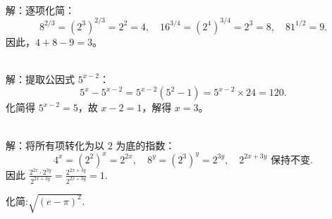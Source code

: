 \documentclass{ctexart}
\newenvironment{MyAnswer}[1][] %
{
    \begin{tcolorbox}[breakable, colframe=blue]
    \begin{Answer}[#1] \color{blue} \kaishu
        }  %
    {\end{Answer}
\end{tcolorbox}
}
\begin{document}
\begin{MyAnswer}[ref={ex:exponent2}]
    \Question {}\\ 
    解：逐项化简：
    $$
    8^{2/3} = (2^3)^{2/3} = 2^2 = 4, \quad 
    16^{3/4} = (2^4)^{3/4} = 2^3 = 8, \quad 
    81^{1/2} = 9.
    $$
    因此，$4 + 8 - 9 = 3$。  
 
    \Question {}\\ 
    解：提取公因式 $5^{x-2}$：
    $$
    5^{x} - 5^{x-2} = 5^{x-2}(5^2 - 1) = 5^{x-2} \times 24 = 120.
    $$
    化简得 $5^{x-2} = 5$，故 $x - 2 = 1$，解得 $x = 3$。

    \Question {}\\ 
    解：将所有项转化为以 $2$ 为底的指数：
    $$
    4^x = (2^2)^x = 2^{2x}, \quad 8^y = (2^3)^y = 2^{3y}, \quad 2^{2x + 3y} \text{ 保持不变}.
    $$
    因此
    $
    \frac{2^{2x} \cdot 2^{3y}}{2^{2x + 3y}} = \frac{2^{2x + 3y}}{2^{2x + 3y}} = 1.
    $ %
\end{MyAnswer}


\begin{Exercise}[title={指数运算小练习3}, label={ex:exponent3}]
    \Question  化简:$\sqrt{(e - \pi)^2}$.
\end{Exercise}



\begin{MyAnswer}[ref={ex:exponent3}]
    \Question {}\\ 


\end{MyAnswer}
\clearpage
\end{document}
